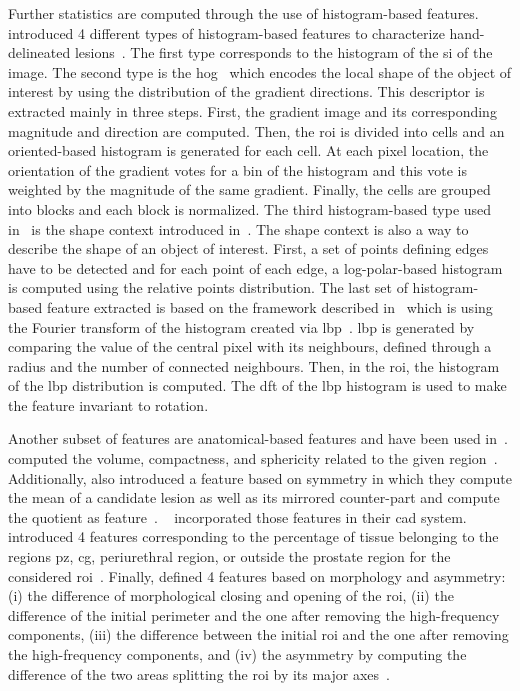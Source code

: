 \begin{enumerate}[leftmargin=*]
Further statistics are computed through the use of histogram-based features.
\citeauthor{Liu2013} introduced 4 different types of histogram-based features
to characterize hand-delineated lesions~\cite{Liu2013}.
The first type corresponds to the histogram of the \ac{si} of the image.
The second type is the \ac{hog}~\cite{Dalal2005} which encodes the local shape
of the object of interest by using the distribution of the gradient
directions.
This descriptor is extracted mainly in three steps.
First, the gradient image and its corresponding magnitude and direction are
computed.
Then, the \ac{roi} is divided into cells and an oriented-based histogram is
generated for each cell.
At each pixel location, the orientation of the gradient votes for a bin of the
histogram and this vote is weighted by the magnitude of the same gradient.
Finally, the cells are grouped into blocks and each block is normalized.
The third histogram-based type used in~\cite{Liu2013} is the shape context
introduced in~\cite{Belongie2002}.
The shape context is also a way to describe the shape of an object of interest.
First, a set of points defining edges have to be detected and for each point of
each edge, a log-polar-based histogram is computed using the relative points
distribution.
The last set of histogram-based feature extracted is based on the framework
described in~\cite{Zhao2012} which is using the Fourier transform of the
histogram created via \acf{lbp}~\cite{Ojala1996}.
\Ac{lbp} is generated by comparing the value of the central pixel with its
neighbours, defined through a radius and the number of connected neighbours.
Then, in the \ac{roi}, the histogram of the \ac{lbp} distribution is computed.
The \acf{dft} of the \ac{lbp} histogram is used to make the feature invariant
to rotation.

Another subset of features are anatomical-based features and have been used
in~\cite{Litjens2012,Litjens2014,Matulewicz2013,cameron2014multiparametric,cameron2016maps}.
\citeauthor{Litjens2012} computed the volume, compactness, and sphericity
related to the given region~\cite{Litjens2012, Litjens2014}.
Additionally, \citeauthor{Litjens2014} also introduced a feature based on
symmetry in which they compute the mean of a candidate lesion as well as its
mirrored counter-part and compute the quotient as feature~\cite{Litjens2014}.
\citeauthor{Lemaitre2016thesis}~\cite{Lemaitre2016thesis} incorporated those
features in their \ac{cad} system.
\citeauthor{Matulewicz2013} introduced 4 features corresponding to the
percentage of tissue belonging to the regions \ac{pz}, \ac{cg}, periurethral
region, or outside the prostate region for the considered
\ac{roi}~\cite{Matulewicz2013}.
Finally, \citeauthor{cameron2016maps} defined 4 features based on morphology
and asymmetry:
(i) the difference of morphological closing and opening of the \ac{roi}, (ii)
the difference of the initial perimeter and the one after removing the
high-frequency components, (iii) the difference between the initial \ac{roi}
and the one after removing the high-frequency components, and (iv) the
asymmetry by computing the difference of the two areas splitting the \ac{roi}
by its major axes~\cite{cameron2014multiparametric,cameron2016maps}.


\end{enumerate}
